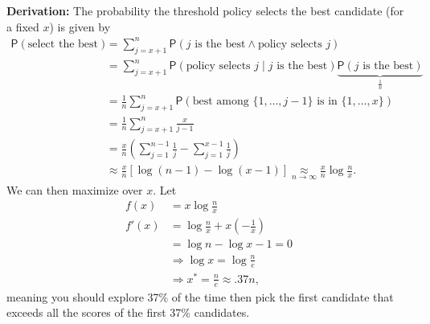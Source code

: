 \documentclass[plain]{article}
\newcommand{\1}{\mathbbm{1}}
\newcommand{\Prob}{ \mathsf{P} }
\begin{document}
\textbf{Derivation:}
The probability the threshold policy selects the best candidate (for a fixed $x$) is given by
\begin{align*}
\Prob(\text{select the best})
&= \sum_{j=x+1}^n \Prob(j\text{ is the best} \wedge \text{policy selects }j)\\
&= \sum_{j=x+1}^n \Prob(\text{policy selects }j\mid j\text{ is the best})
    \underbrace{\Prob(j\text{ is the best})}_{\frac{1}{n}}\\
&= \frac{1}{n}\sum_{j=x+1}^n\Prob(\text{best among }\{1,\ldots,j-1\}\text{ is in }\{1,\ldots,x\})\\
&= \frac{1}{n}\sum_{j=x+1}^n\frac{x}{j-1}\\
&= \frac{x}{n}\left(\sum_{j=1}^{n-1}\frac{1}{j} - \sum_{j=1}^{x-1}\frac{1}{j}\right)\\
&\approx \frac{x}{n} \left[ \log(n-1) - \log(x-1) \right]
\underset{n\to\infty}{\approx} \frac{x}{n}\log\frac{n}{x}.
\end{align*}
We can then maximize over $x$.
Let
\begin{align*}
f(x) &= x \log \frac{n}{x}\\
f'(x) &= \log \frac{n}{x} + x\left(-\frac{1}{x}\right)\\
&= \log n - \log x - 1 = 0\\
&\Rightarrow \log x = \log \frac{n}{e}\\
&\Rightarrow x^* = \frac{n}{e} \approx .37 n,
\end{align*}
meaning you should explore 37\% of the time
then pick the first candidate that exceeds all the scores of the first 37\% candidates.
\end{document}

